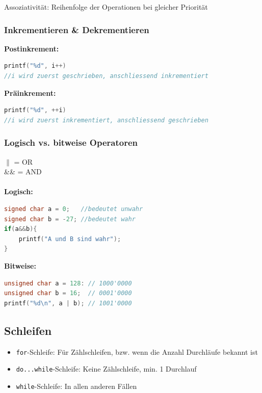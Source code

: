 			Assoziativität: Reihenfolge der Operationen bei gleicher Priorität
		
		\subsubsection{Inkrementieren \& Dekrementieren}
			\textbf{Postinkrement:}
			\begin{lstlisting}[language=C]
printf("%d", i++)
//i wird zuerst geschrieben, anschliessend inkrementiert
			\end{lstlisting}
			\textbf{Präinkrement:}
			\begin{lstlisting}[language=C]
printf("%d", ++i)
//i wird zuerst inkrementiert, anschliessend geschrieben
			\end{lstlisting}

		\subsubsection{Logisch vs. bitweise Operatoren}
			$\parallel$ = OR\\
			\&\& = AND \\
			\\
			\textbf{Logisch:}
				\begin{lstlisting}[language=C]
signed char a = 0;   //bedeutet unwahr
signed char b = -27; //bedeutet wahr
if(a&&b){
	printf("A und B sind wahr");
}	
				\end{lstlisting}
			\textbf{Bitweise:}
				\begin{lstlisting}[language=C]
unsigned char a = 128: // 1000'0000
unsigned char b = 16;  // 0001'0000
printf("%d\n", a | b); // 1001'0000 
				\end{lstlisting}

	\subsection{Schleifen}
		\begin{itemize}
			\item \verb|for|-Schleife: Für Zählschleifen, bzw. wenn die Anzahl Durchläufe bekannt ist
			\item \verb|do...while|-Schleife: Keine Zählschleife, min. 1 Durchlauf
			\item \verb|while|-Schleife: In allen anderen Fällen	
		\end{itemize}

